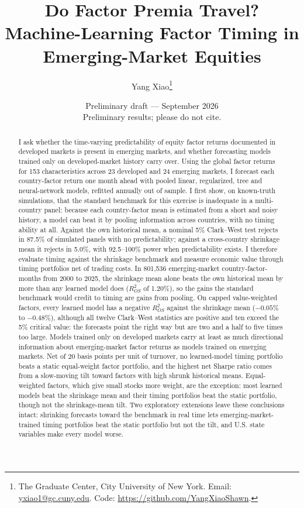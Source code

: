 \documentclass[11pt]{article}
\title{Do Factor Premia Travel?\\[4pt] \large Machine-Learning Factor Timing in Emerging-Market Equities}
\author{Yang Xiao\thanks{The Graduate Center, City University of New York. Email: \href{mailto:yxiao1@gc.cuny.edu}{yxiao1@gc.cuny.edu}. Code: \url{https://github.com/YangXiaoShawn}.}}
\date{Preliminary draft --- September 2026\\ \small Preliminary results; please do not cite.}
\begin{document}
\maketitle

\begin{abstract}
\noindent I ask whether the time-varying predictability of equity factor returns documented in developed markets is present in emerging markets, and whether forecasting models trained only on developed-market history carry over. Using the \citet{jensen2023replication} global factor returns for 153 characteristics across 23 developed and 24 emerging markets, I forecast each country-factor return one month ahead with pooled linear, regularized, tree and neural-network models, refitted annually out of sample. I first show, on known-truth simulations, that the standard benchmark for this exercise is inadequate in a multi-country panel: because each country-factor mean is estimated from a short and noisy history, a model can beat it by pooling information across countries, with no timing ability at all. Against the own historical mean, a nominal 5\% Clark--West test rejects in 87.5\% of simulated panels with no predictability; against a cross-country shrinkage mean it rejects in 5.0\%, with 92.5--100\% power when predictability exists. I therefore evaluate timing against the shrinkage benchmark and measure economic value through timing portfolios net of trading costs. In 801,536 emerging-market country-factor-months from 2000 to 2025, the shrinkage mean alone beats the own historical mean by more than any learned model does ($R^2_{OS}$ of 1.20\%), so the gains the standard benchmark would credit to timing are gains from pooling. On capped value-weighted factors, every learned model has a negative $R^2_{OS}$ against the shrinkage mean ($-0.05$\% to $-0.48$\%), although all twelve Clark--West statistics are positive and ten exceed the 5\% critical value: the forecasts point the right way but are two and a half to five times too large. Models trained only on developed markets carry at least as much directional information about emerging-market factor returns as models trained on emerging markets. Net of 20 basis points per unit of turnover, no learned-model timing portfolio beats a static equal-weight factor portfolio, and the highest net Sharpe ratio comes from a slow-moving tilt toward factors with high shrunk historical means. Equal-weighted factors, which give small stocks more weight, are the exception: most learned models beat the shrinkage mean and their timing portfolios beat the static portfolio, though not the shrinkage-mean tilt. Two exploratory extensions leave these conclusions intact: shrinking forecasts toward the benchmark in real time lets emerging-market-trained timing portfolios beat the static portfolio but not the tilt, and U.S. state variables make every model worse.
\end{abstract}
\end{document}
